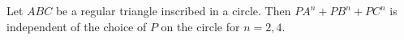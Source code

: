 Let $ABC$ be a regular triangle inscribed in a circle. Then $PA^n + PB^n + PC^n$ is independent of the choice of $P$ on the circle for $n = 2, 4$.
